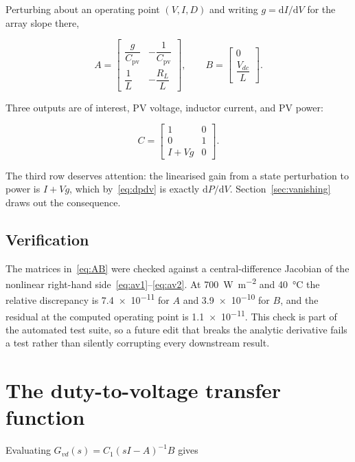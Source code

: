 Perturbing about an operating point $(V, I, D)$ and writing
$g = \mathrm{d}I/\mathrm{d}V$ for the array slope there,

\begin{equation}
A = \begin{bmatrix}
\dfrac{g}{C_{\mathrm{pv}}} & -\dfrac{1}{C_{\mathrm{pv}}}\\[2ex]
\dfrac{1}{L} & -\dfrac{R_L}{L}
\end{bmatrix},
\qquad
B = \begin{bmatrix} 0 \\[1ex] \dfrac{V_{dc}}{L}\end{bmatrix} .
\label{eq:AB}
\end{equation}

Three outputs are of interest, PV voltage, inductor current, and PV power:

\begin{equation}
C = \begin{bmatrix}
1 & 0\\
0 & 1\\
I + Vg & 0
\end{bmatrix} .
\label{eq:C}
\end{equation}

The third row deserves attention: the linearised gain from a state perturbation
to power is $I + Vg$, which by~\eqref{eq:dpdv} is exactly
$\mathrm{d}P/\mathrm{d}V$. Section~\ref{sec:vanishing} draws out the
consequence.

\subsection{Verification}

The matrices in~\eqref{eq:AB} were checked against a central-difference Jacobian
of the nonlinear right-hand side~\eqref{eq:av1}--\eqref{eq:av2}. At
\SI{700}{\watt\per\square\metre} and \SI{40}{\celsius} the relative discrepancy
is \num{7.4e-11} for $A$ and \num{3.9e-10} for $B$, and the residual at the
computed operating point is \SI{1.1e-11}{}. This check is part of the automated
test suite, so a future edit that breaks the analytic derivative fails a test
rather than silently corrupting every downstream result.

\section{The duty-to-voltage transfer function}
\label{sec:nozero}

Evaluating $G_{vd}(s) = C_1 (sI - A)^{-1} B$ gives

